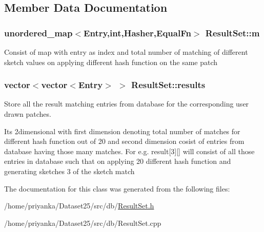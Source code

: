 \subsection{\-Member \-Data \-Documentation}
\hypertarget{classResultSet_ad62d4fd4f4e32c4dec4ddfd6ee1ec4dc}{
\subsubsection[{m}]{\setlength{\rightskip}{0pt plus 5cm}unordered\-\_\-map$<${\bf \-Entry},int,{\bf \-Hasher},{\bf \-Equal\-Fn}$>$ {\bf \-Result\-Set\-::m}}}\label{classResultSet_ad62d4fd4f4e32c4dec4ddfd6ee1ec4dc}
\-Consist of map with entry as index and total number of matching of different sketch values on applying different hash function on the same patch \hypertarget{classResultSet_af94fb0e3ab0007c7c0369e6fbb3a2f86}{
\subsubsection[{results}]{\setlength{\rightskip}{0pt plus 5cm}vector$<$vector$<${\bf \-Entry}$>$ $>$ {\bf \-Result\-Set\-::results}}}\label{classResultSet_af94fb0e3ab0007c7c0369e6fbb3a2f86}


\-Store all the result matching entries from database for the corresponding user drawn patches. 

\-Its 2dimensional with first dimension denoting total number of matches for different hash function out of 20 and second dimension cosist of entries from database having those many matches. \-For e.\-g. result\mbox{[}3\mbox{]}\mbox{[}\mbox{]} will consist of all those entries in database such that on applying 20 different hash function and generating sketches 3 of the sketch match 

\-The documentation for this class was generated from the following files\-:\begin{DoxyCompactItemize}
\item 
/home/priyanka/\-Dataset25/src/db/\hyperlink{ResultSet_8h}{\-Result\-Set.\-h}\item 
/home/priyanka/\-Dataset25/src/db/\-Result\-Set.\-cpp\end{DoxyCompactItemize}
